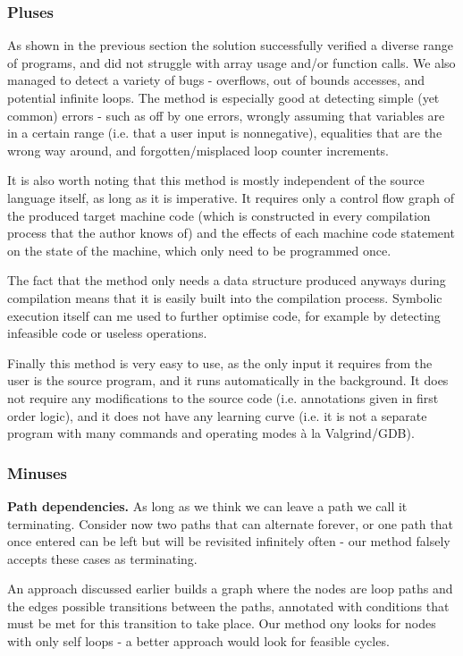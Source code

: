 \documentclass[12pt,a4paper]{article}
\begin{document}
\subsubsection{Pluses}
As shown in the previous section the solution successfully verified a diverse range of programs, and did not struggle with array usage and/or function calls.
We also managed to detect a variety of bugs - overflows, out of bounds accesses, and potential infinite loops. The method is especially good at detecting simple (yet common) errors - such as off by one errors, wrongly assuming that variables are in a certain range
(i.e. that a user input is nonnegative), equalities that are the wrong way around, and forgotten/misplaced loop counter increments.

It is also worth noting that this method is mostly independent of the source language itself, as long as it is imperative. It requires only a control flow graph of the produced target machine code (which is
constructed in every compilation process that the author knows of) and the effects of each machine code statement on the state of the machine, which only need to be programmed once.

The fact that the method only needs a data structure produced anyways during compilation means that it is easily built into the compilation process. Symbolic execution
itself can me used to further optimise code, for example by detecting infeasible code or useless operations.

Finally this method is very easy to use, as the only input it requires from the user is the source program, and it runs automatically in the background. It does
not require any modifications to the source code (i.e. annotations given in first order logic), and it does not have any learning curve (i.e. it is not a separate
program with many commands and operating modes \`a la Valgrind/GDB). 

\subsubsection{Minuses}
\textbf{Path dependencies.} As long as we think we can leave a path we call it terminating. Consider now two paths that can alternate forever, or
one path that once entered can be left but will be revisited infinitely often - our method falsely accepts these cases as terminating.

An approach discussed earlier \citep{loopster} builds a graph where the nodes are loop paths and the edges possible transitions between the paths, annotated with
conditions that must be met for this transition to take place. Our method ony looks for nodes with only self loops - a better approach would look for feasible cycles.
\end{document}
